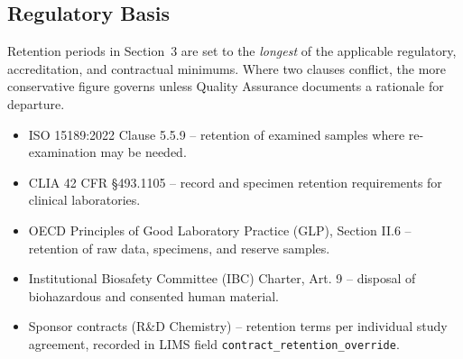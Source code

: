 \subsection{Regulatory Basis}
Retention periods in Section~3 are set to the \emph{longest} of the applicable regulatory,
accreditation, and contractual minimums. Where two clauses conflict, the more conservative
figure governs unless Quality Assurance documents a rationale for departure.

\begin{noticebox}
\begin{itemize}[leftmargin=1.2em]
  \item ISO 15189:2022 Clause 5.5.9 -- retention of examined samples where re-examination may
        be needed.
  \item CLIA 42 CFR \S 493.1105 -- record and specimen retention requirements for clinical
        laboratories.
  \item OECD Principles of Good Laboratory Practice (GLP), Section II.6 -- retention of raw
        data, specimens, and reserve samples.
  \item Institutional Biosafety Committee (IBC) Charter, Art. 9 -- disposal of biohazardous
        and consented human material.
  \item Sponsor contracts (R\&D Chemistry) -- retention terms per individual study agreement,
        recorded in LIMS field \texttt{contract\_retention\_override}.
\end{itemize}
\end{noticebox}
